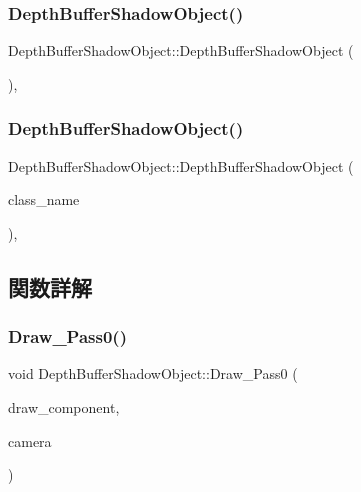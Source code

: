 \subsubsection{\texorpdfstring{Depth\+Buffer\+Shadow\+Object()}{DepthBufferShadowObject()}\hspace{0.1cm}{\footnotesize\ttfamily [1/2]}}
{\footnotesize\ttfamily Depth\+Buffer\+Shadow\+Object\+::\+Depth\+Buffer\+Shadow\+Object (\begin{DoxyParamCaption}{ }\end{DoxyParamCaption})\hspace{0.3cm}{\ttfamily [private]}, {\ttfamily [delete]}}

\mbox{\label{class_depth_buffer_shadow_object_af144bdc29aabd1a84e789e3788d0a9a8}} 
\subsubsection{\texorpdfstring{Depth\+Buffer\+Shadow\+Object()}{DepthBufferShadowObject()}\hspace{0.1cm}{\footnotesize\ttfamily [2/2]}}
{\footnotesize\ttfamily Depth\+Buffer\+Shadow\+Object\+::\+Depth\+Buffer\+Shadow\+Object (\begin{DoxyParamCaption}\item[{const \mbox{\hyperlink{class_depth_buffer_shadow_object}{Depth\+Buffer\+Shadow\+Object}} \&}]{class\+\_\+name }\end{DoxyParamCaption})\hspace{0.3cm}{\ttfamily [private]}, {\ttfamily [delete]}}



\subsection{関数詳解}
\mbox{\label{class_depth_buffer_shadow_object_a7916c03b90a01c71a9050e721cf6810c}} 
\subsubsection{\texorpdfstring{Draw\+\_\+\+Pass0()}{Draw\_Pass0()}}
{\footnotesize\ttfamily void Depth\+Buffer\+Shadow\+Object\+::\+Draw\+\_\+\+Pass0 (\begin{DoxyParamCaption}\item[{Draw\+Component $\ast$}]{draw\+\_\+component,  }\item[{\mbox{\hyperlink{class_camera}{Camera}} $\ast$}]{camera }\end{DoxyParamCaption})\hspace{0.3cm}{\ttfamily [static]}}



